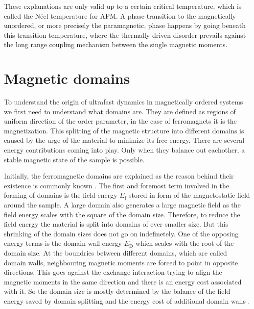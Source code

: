 \FloatBarrier
These explanations are only valid up to a certain critical temperature, which is called the Néel temperature for AFM.
A phase transition to the magnetically unordered, or more precisely the paramagnetic, phase happens by going beneath this transition temperature, where the thermally driven disorder prevails against the long range coupling mechanism between the single magnetic moments.


\section{Magnetic domains}
To understand the origin of ultrafast dynamics in magnetically ordered systems we first need to understand what domains are.
They are defined as regions of uniform direction of the order parameter, in the case of ferromagnets it is the magnetization.
This splitting of the magnetic structure into different domains is caused by the urge of the material to minimize its free energy.
There are several energy contributions coming into play.
Only when they balance out eachother, a stable magnetic state of the sample is possible.

Initially, the ferromagnetic domains are explained as the reason behind their existence is commonly known .
The first and foremost term involved in the forming of domains is the field energy $E_{\text{f}}$ stored in form of the magnetostatic field around the sample.
A large domain also generates a large magnetic field as the field energy scales with the square of the domain size.
Therefore, to reduce the field energy the material is split into domains of ever smaller size.
But this shrinking of the domain sizes does not go on indefinetely.
One of the opposing energy terms is the domain wall energy $E_{\text{D}}$ which scales with the root of the domain size.
At the boundries between different domains, which are called domain walls, neighbouring magnetic moments are forced to point in opposite directions.
This goes against the exchange interaction trying to align the magnetic moments in the same direction and there is an energy cost associated with it.
So the domain size is mostly determined by the balance of the field energy saved by domain splitting and the energy cost of additional domain walls .

